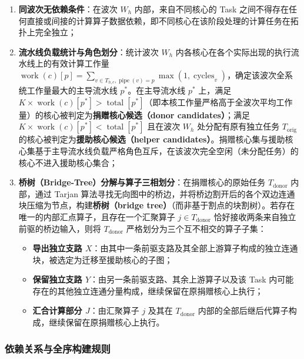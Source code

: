 \documentclass[anonymous,notoc]{gmcm2026}
\providecommand{\tightlist}{\setlength{\itemsep}{0pt}\setlength{\parskip}{0pt}}
\begin{document}
\begin{enumerate}
\def\labelenumi{\arabic{enumi}.}
\tightlist
\item
  \textbf{同波次无依赖条件}：在波次 \(W_h\) 内部，来自不同核心的 Task 之间不得存在任何直接或间接的计算算子数据依赖，即不同核心在该阶段处理的计算任务在拓扑上完全独立；
\item
  \textbf{流水线负载统计与角色划分}：统计波次 \(W_h\) 内各核心在各个实际出现的执行流水线上的有效计算工作量 \(\operatorname{work}(c)[p] = \sum_{v \in T_{h, c}, \operatorname{pipe}(v) = p} \max(1, \operatorname{cycles}_v)\)，确定该波次全系统工作量最大的主导流水线 \(p^*\)。在主导流水线 \(p^*\) 上，满足 \(K \times \operatorname{work}(c)[p^*] > \operatorname{total}[p^*]\)（即本核工作量严格高于全波次平均工作量）的核心被判定为\textbf{捐赠核心候选（donor candidates）}；满足 \(K \times \operatorname{work}(c)[p^*] < \operatorname{total}[p^*]\) 且在波次 \(W_h\) 处分配有原有独立任务 \(T_{\mathrm{orig}}\) 的核心被判定为\textbf{援助核心候选（helper candidates）}。捐赠核心集与援助核心集基于主导流水线负载严格角色互斥，在该波次完全空闲（未分配任务）的核心不进入援助核心集合；
\item
  \textbf{桥树（Bridge-Tree）分解与算子三相划分}：在捐赠核心的原始任务 \(T_{\mathrm{donor}}\) 内部，通过 Tarjan 算法寻找无向图中的桥边，并将桥边割开后的各个双边连通块压缩为节点，构建\textbf{桥树（bridge tree）}（而非基于割点的块割树）。若存在唯一的内部汇点算子，且存在一个汇聚算子 \(j \in T_{\mathrm{donor}}\) 恰好接收两条来自独立前驱的桥边输入，则将 \(T_{\mathrm{donor}}\) 严格划分为三个互不相交的算子子集：

  \begin{itemize}
  \tightlist
  \item
    \textbf{导出独立支路 \(X\)}：由其中一条前驱支路及其全部上游算子构成的独立连通块，被选定为迁移至援助核心的子图；
  \item
    \textbf{保留独立支路 \(Y\)}：由另一条前驱支路、其余上游算子以及该 Task 内可能存在的其他独立连通分量构成，继续保留在原捐赠核心上执行；
  \item
    \textbf{汇合计算部分 \(J\)}：由汇聚算子 \(j\) 及其在 \(T_{\mathrm{donor}}\) 内部的全部后继后代算子构成，继续保留在原捐赠核心上执行。
  \end{itemize}
\end{enumerate}

\subsubsection{依赖关系与全序构建规则}
\end{document}
